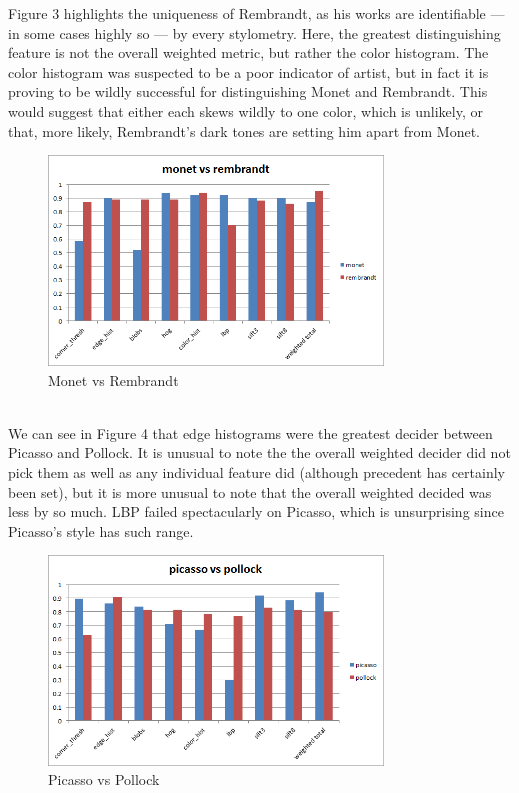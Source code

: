 \documentclass{article}
\begin{document}
  Figure 3 highlights the uniqueness of Rembrandt, as his
  works are identifiable --- in some cases highly so --- by every stylometry.
  Here, the greatest distinguishing feature is not the overall weighted metric,
  but rather the color histogram. The color histogram was suspected to be a poor
  indicator of artist, but in fact it is proving to be wildly successful for
  distinguishing Monet and Rembrandt. This would suggest that either each skews
  wildly to one color, which is unlikely, or that, more likely, Rembrandt's dark
  tones are setting him apart from Monet.
  \begin{figure}[h!]
    \begin{center}
      \includegraphics[width=3.5in]{graphs/monet_rembrandt.png}
      \caption{Monet vs Rembrandt}
    \end{center}
  \end{figure} \\

  We can see in Figure 4 that edge histograms were the greatest decider between
  Picasso and Pollock. It is unusual to note the the overall weighted decider
  did not pick them as well as any individual feature did (although precedent
  has certainly been set), but it is more unusual to note that the overall
  weighted decided was less by so much. LBP failed spectacularly on Picasso,
  which is unsurprising since Picasso's style has such range.
  \begin{figure}[h!]
    \begin{center}
      \includegraphics[width=3.5in]{graphs/picasso_pollock.png}
      \caption{Picasso vs Pollock}
    \end{center}
  \end{figure} \\
\end{document}
